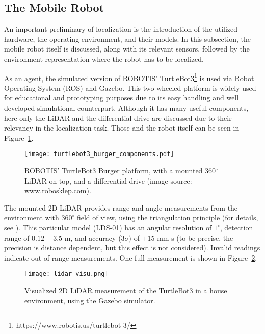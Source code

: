\subsection{The Mobile Robot}
An important preliminary of localization is the introduction of the utilized hardware, the operating environment,
and their models.
In this subsection, the mobile robot itself is discussed, along with its relevant sensors,
followed by the environment representation where the robot has to be localized.

As an agent, the simulated version of ROBOTIS' TurtleBot3\footnote{https://www.robotis.us/turtlebot-3/} is used via Robot Operating System (ROS) and Gazebo.
This two-wheeled platform is widely used for educational and prototyping purposes due to its easy handling
and well developed simulational counterpart. Although it has many useful components, here only the LiDAR and the
differential drive are discussed due to their relevancy in the localization task.
Those and the robot itself can be seen in Figure~\ref{fig:turtlebot3-burger}.
\begin{figure}[htbp]
    \centering
    \texttt{[image: turtlebot3\_burger\_components.pdf]}
    \caption[]{ROBOTIS' TurtleBot3 Burger platform, with a mounted 360$^\circ$ LiDAR on top, and a differential drive (image source: www.robosklep.com).}
    \label{fig:turtlebot3-burger}
\end{figure}

The mounted 2D LiDAR provides range and angle measurements from the environment with $360^\circ$ field of view,
using the triangulation principle (for details, see \cite{Konolige2016}).
This particular model (LDS-01) has an angular resolution of $1^\circ$, detection range of $0.12-3.5$ m,
and accuracy (3$\sigma$) of $\pm$15 mm-s (to be precise, the precision is distance dependent, but this effect is not considered).
Invalid readings indicate out of range measurements. One full measurement is shown in Figure~\ref{fig:lidar-readings}.
\begin{figure}[htbp]
    \centering
    \texttt{[image: lidar-visu.png]}
    \caption{Visualized 2D LiDAR measurement of the TurtleBot3 in a house environment, using the Gazebo simulator.}
    \label{fig:lidar-readings}
\end{figure}

